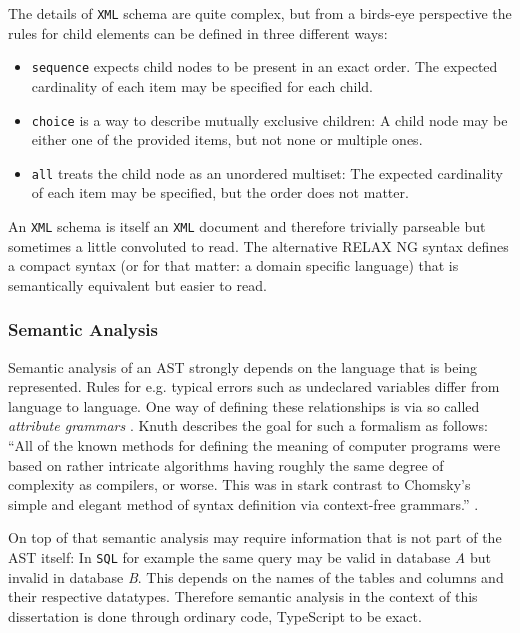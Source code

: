 The details of \texttt{XML} schema are quite complex, but from a birds-eye perspective the rules for child elements can be defined in three different ways:

\begin{itemize}
\item \texttt{sequence} expects child nodes to be present in an exact order. The expected cardinality of each item may be specified for each child.
\item \texttt{choice} is a way to describe mutually exclusive children: A child node may be either one of the provided items, but not none or multiple ones.
\item \texttt{all} treats the child node as an unordered multiset: The expected cardinality of each item may be specified, but the order does not matter.
\end{itemize}

An \texttt{XML} schema is itself an \texttt{XML} document and therefore trivially parseable but sometimes a little convoluted to read. The alternative RELAX NG syntax defines a compact syntax (or for that matter: a domain specific language) that is semantically equivalent but easier to read.

\subsubsection{Semantic Analysis}

Semantic analysis of an AST strongly depends on the language that is being represented. Rules for e.g. typical errors such as undeclared variables differ from language to language. One way of defining these relationships is via so called \textit{attribute grammars} \cite{knuth_semantics_1968}. Knuth describes the goal for such a formalism as follows: \enquote{All of the known methods for defining the meaning of computer programs were
based on rather intricate algorithms having roughly the same degree of complexity as
compilers, or worse. This was in stark contrast to Chomsky’s simple and elegant method
of syntax definition via context-free grammars.} \cite{knuth_genesis_1990}.

On top of that semantic analysis may require information that is not part of the AST itself: In \texttt{SQL} for example the same query may be valid in database \textit{A} but invalid in database \textit{B}. This depends on the names of the tables and columns and their respective datatypes. Therefore semantic analysis in the context of this dissertation is done through ordinary code, TypeScript to be exact.



